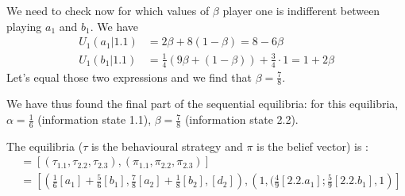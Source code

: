 \begin{itemize}
    We need to check now for which values of $\beta$ player one is indifferent between playing $a_1$ and $b_1$. We have 
    \begin{align*}
        U_1(a_1|1.1)&= 2\beta + 8 (1-\beta) = 8 - 6 \beta\\
        U_1(b_1|1.1)&=\frac{1}{4} (9\beta + (1-\beta) ) + \frac{3}{4} \cdot 1 = 1 + 2\beta
    \end{align*} 
    Let's equal those two expressions and we find that $\beta = \frac{7}{8}$. 
    
    We have thus found the final part of the sequential equilibria: for this equilibria, $\alpha=\frac{1}{6}$ (information state 1.1), $\beta =\frac{7}{8}$ (information state 2.2).
\end{itemize}
    
The equilibria  ($\tau$ is the behavioural strategy and $\pi$ is the belief vector) is :
\begin{align*}
        [\tau, \pi ]&= \left[ \left(\tau_{1.1},\tau_{2.2},\tau_{2.3} \right), \left(\pi_{1.1}, \pi_{2.2} , \pi_{2.3}\right) \right]\\
        &=\left[ \left(\frac{1}{6} [a_1] + \frac{5}{6} [b_1], \frac{7}{8} [a_2] +\frac{1}{8} [b_2], [d_2]\right) , \left( 1, (\frac{4}{9} [2.2.a_1];\frac{5}{9} [2.2.b_1],1\right)\right]
\end{align*} 

